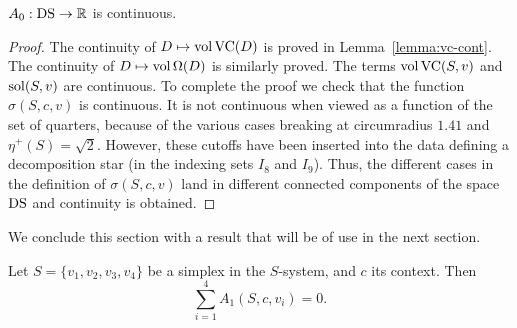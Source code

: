 



\begin{lemma}  $A_0:{\operatorname{DS}}\to\mathbb{R}$ is continuous.
\end{lemma}

\begin{proof}
The continuity of $D\mapsto{\operatorname{vol}}\,{\operatorname{VC}}(D)$ is proved in
Lemma~\ref{lemma:vc-cont}.  The continuity of
$D\mapsto{\operatorname{vol}}\,\Omega(D)$ is similarly proved.  The terms
${\operatorname{vol}}\,{\operatorname{VC}}(S,v)$ and $\operatorname{sol}(S,v)$ are continuous. To complete
the proof we check that the function $\sigma(S,c,v)$ is continuous.
It is not continuous when viewed as a function of the set of
quarters, because of the various cases breaking at circumradius
$1.41$ and $\eta^+(S)=\sqrt2$.  However, these cutoffs have been
inserted into the data defining a decomposition star (in the
indexing sets $I_8$ and $I_9$).  Thus, the different cases in the
definition of $\sigma(S,c,v)$ land in different connected components
of the space ${\operatorname{DS}}$ and continuity is obtained.
\end{proof}

We conclude this section with a result that will be of use in the
next section.

\begin{lemma}\label{lemma:A1-cancel}
Let $S=\{v_1,v_2,v_3,v_4\}$ be a simplex in the $S$-system,  and $c$
its context.   Then
   $$\sum_{i=1}^4 A_1(S,c,v_i)=0.$$
\end{lemma}

